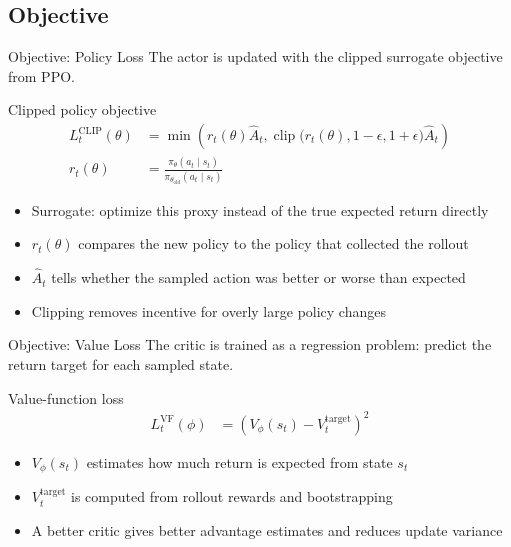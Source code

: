\documentclass[aspectratio=169, 11pt]{beamer}
\begin{document}
\subsection{Objective}
\begin{frame}{Objective: Policy Loss}
  The actor is updated with the clipped surrogate objective from PPO.

  \vspace{0.6em}
  \begin{block}{Clipped policy objective}
    \begin{align*}
      L_t^{\mathrm{CLIP}}(\theta)
      &= \min\!\left(
          r_t(\theta)\hat{A}_t,
          \operatorname{clip}\bigl(r_t(\theta), 1-\epsilon, 1+\epsilon\bigr)\hat{A}_t
        \right) \\
      r_t(\theta)
      &= \frac{\pi_\theta(a_t\mid s_t)}{\pi_{\theta_{\mathrm{old}}}(a_t\mid s_t)}
    \end{align*}
  \end{block}

  \begin{itemize}
    \item Surrogate: optimize this proxy instead of the true expected return directly
    \item $r_t(\theta)$ compares the new policy to the policy that collected the rollout
    \item $\hat{A}_t$ tells whether the sampled action was better or worse than expected
    \item Clipping removes incentive for overly large policy changes
  \end{itemize}
\end{frame}

\begin{frame}{Objective: Value Loss}
  The critic is trained as a regression problem: predict the return target for
  each sampled state.

  \vspace{0.6em}
  \begin{block}{Value-function loss}
    \begin{align*}
      L_t^{\mathrm{VF}}(\phi)
      &= \left(V_\phi(s_t) - V_t^{\mathrm{target}}\right)^2
    \end{align*}
  \end{block}

  \begin{itemize}
    \item $V_\phi(s_t)$ estimates how much return is expected from state $s_t$
    \item $V_t^{\mathrm{target}}$ is computed from rollout rewards and bootstrapping
    \item A better critic gives better advantage estimates and reduces update variance
  \end{itemize}
\end{frame}
\end{document}
